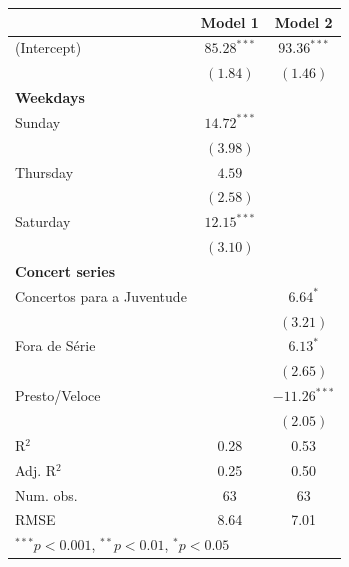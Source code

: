 \documentclass[a4paper, 12pt, openright, oneside, german, french, brazil, english]{abntex2}
\begin{document}
        \begin{table}[!ht]
          {\begin{tabular}{l c c }
             \hline
             & Model 1 & Model 2 \\
             \hline
             (Intercept)                                        & $85.28^{***}$ & $93.36^{***}$  \\
             & $(1.84)$      & $(1.46)$       \\
             \textbf{Weekdays} & & \\
             Sunday & $14.72^{***}$ &                \\
             & $(3.98)$      &                \\
             Thursday  & $4.59$        &                \\
             & $(2.58)$      &                \\
             Saturday  & $12.15^{***}$ &                \\
             & $(3.10)$      &                \\
             \textbf{Concert series} & & \\
             Concertos para a Juventude                    &               & $6.64^{*}$     \\
             &               & $(3.21)$       \\
             Fora de Série                                 &               & $6.13^{*}$     \\
             &               & $(2.65)$       \\
             Presto/Veloce                                 &               & $-11.26^{***}$ \\
             &               & $(2.05)$       \\
             \hline
             R$^2$                                              & 0.28          & 0.53           \\
             Adj. R$^2$                                         & 0.25          & 0.50           \\
             Num. obs.                                          & 63            & 63             \\
             RMSE                                               & 8.64          & 7.01           \\
             \hline
             \multicolumn{3}{l}{\scriptsize{$^{***}p<0.001$, $^{**}p<0.01$, $^*p<0.05$}}
           \end{tabular}
         }
         {}
       \end{table}
\end{document}
